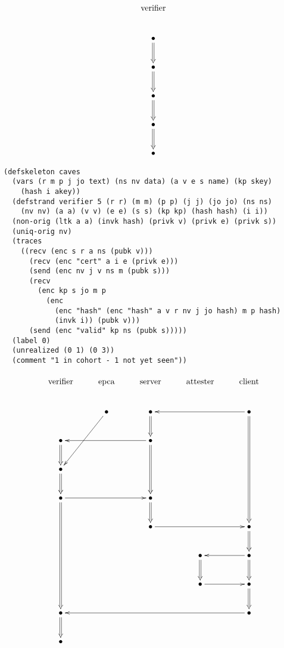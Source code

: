 \documentclass[titlepage,12pt]{article}
\theoremstyle{definition}
\begin{document}
$$\xymatrix{
\txt{\strut verifier}\\
\bullet\ar@{=>}[d]\\
\bullet\ar@{=>}[d]\\
\bullet\ar@{=>}[d]\\
\bullet\ar@{=>}[d]\\
\bullet}$$

\begin{verbatim}
(defskeleton caves
  (vars (r m p j jo text) (ns nv data) (a v e s name) (kp skey)
    (hash i akey))
  (defstrand verifier 5 (r r) (m m) (p p) (j j) (jo jo) (ns ns)
    (nv nv) (a a) (v v) (e e) (s s) (kp kp) (hash hash) (i i))
  (non-orig (ltk a a) (invk hash) (privk v) (privk e) (privk s))
  (uniq-orig nv)
  (traces
    ((recv (enc s r a ns (pubk v)))
      (recv (enc "cert" a i e (privk e)))
      (send (enc nv j v ns m (pubk s)))
      (recv
        (enc kp s jo m p
          (enc
            (enc "hash" (enc "hash" a v r nv j jo hash) m p hash)
            (invk i)) (pubk v)))
      (send (enc "valid" kp ns (pubk s)))))
  (label 0)
  (unrealized (0 1) (0 3))
  (comment "1 in cohort - 1 not yet seen"))
\end{verbatim}

$$\xymatrix{
\txt{\strut verifier}&\txt{\strut epca}&\txt{\strut server}&\txt{\strut attester}&\txt{\strut client}\\
&\bullet\ar[ldd]&\bullet\ar@{=>}[d]&&\bullet\ar@{=>}[dddd]\ar[ll]\\
\bullet\ar@{=>}[d]&&\bullet\ar@{=>}[dd]\ar[ll]&&\\
\bullet\ar@{=>}[d]&&&&\\
\bullet\ar@{=>}[dddd]\ar[rr]&&\bullet\ar@{=>}[d]&&\\
&&\bullet\ar[rr]&&\bullet\ar@{=>}[d]\\
&&&\bullet\ar@{=>}[d]&\bullet\ar@{=>}[d]\ar[l]\\
&&&\bullet\ar[r]&\bullet\ar@{=>}[d]\\
\bullet\ar@{=>}[d]&&&&\bullet\ar[llll]\\
\bullet&&&&}$$
\end{document}
